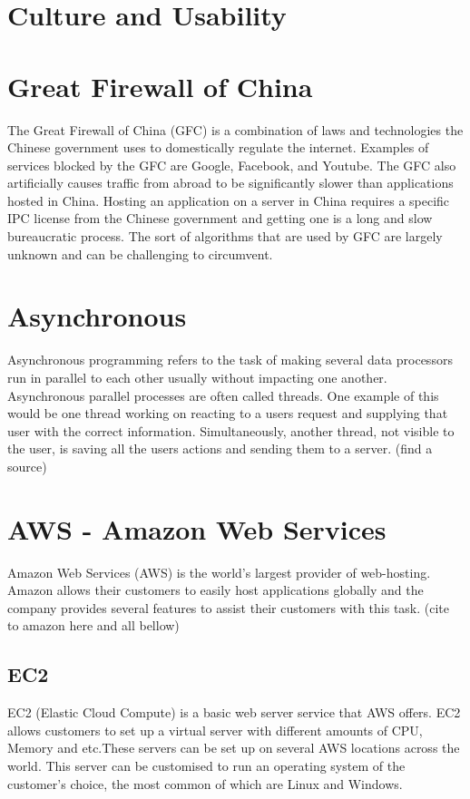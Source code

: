 \section{Culture and Usability}

\section{Great Firewall of China}
The Great Firewall of China (GFC) is a combination of laws and technologies the Chinese government uses to domestically regulate the internet. Examples of services blocked by the GFC are Google, Facebook, and Youtube. The GFC also artificially causes traffic from abroad to be significantly slower than applications hosted in China. Hosting an application on a server in China requires a specific IPC license from the Chinese government and getting one is a long and slow bureaucratic process. The sort of algorithms that are used by GFC are largely unknown and can be challenging to circumvent.
\section{Asynchronous}
Asynchronous programming refers to the task of making several data processors run in parallel to each other usually without impacting one another. Asynchronous parallel processes are often called threads. One example of this would be one thread working on reacting to a users request and supplying that user with the correct information. Simultaneously, another thread, not visible to the user, is saving all the users actions and sending them to a server. (find a source)  

\section{AWS - Amazon Web Services}
Amazon Web Services (AWS) is the world's largest provider of web-hosting. Amazon allows their customers to easily host applications globally and the company provides several features to assist their customers with this task. (cite to amazon here and all bellow)
\subsection{EC2}
EC2 (Elastic Cloud Compute) is a basic web server service that AWS offers. EC2 allows customers to set up a virtual server with different amounts of CPU, Memory  and etc.These servers can be set up on several AWS locations across the world. This server can be customised to run an operating system of the customer's choice, the most common of which are Linux and Windows.
